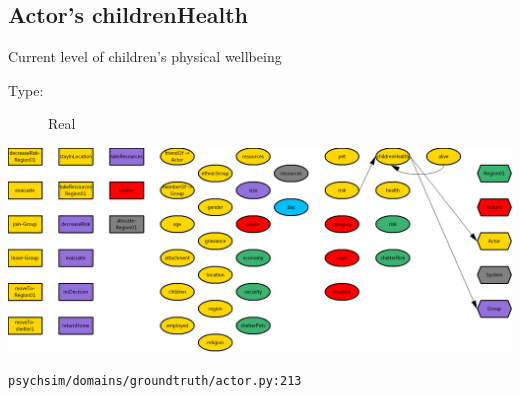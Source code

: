 \documentclass{article}%
\begin{document}
%
\subsection{Actor's childrenHealth}%
\label{subsec:Actor's childrenHealth}%
Current level of children's physical wellbeing%
\begin{description}%
\item[Type:]%
Real%
\end{description}%
\includegraphics[width=\textwidth]{images/childrenHealthOfActor.png}%
\begin{flushleft}%
\verb|psychsim/domains/groundtruth/actor.py:213|%
\end{flushleft}%
\end{document}
